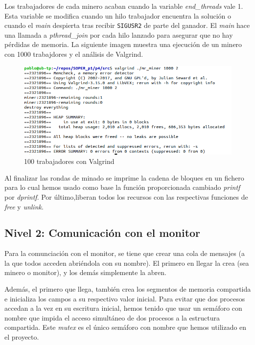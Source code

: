 \documentclass{article}
\begin{document}
    Los trabajadores de cada minero acaban cuando la variable \textit{end\_threads} vale 1. Esta variable se modifica cuando un hilo trabajador encuentra la solución o cuando el \textit{main} despierta tras recibir \texttt{SIGUSR2} de parte del ganador. El \textit{main} hace una llamada a \textit{pthread\_join} por cada hilo lanzado para asegurar que no hay pérdidas de memoria. La siguiente imagen muestra una ejecución de un minero con 1000 trabajdores y el análisis de Valgrind.

    \begin{figure}[h!]
        \centering
        \includegraphics[scale=.41]{./pruebas/valgrind_1000_trabajadores}
        \caption{100 trabajadores con Valgrind}
    \end{figure}


    
    Al finalizar las rondas de minado se imprime la cadena de bloques en un fichero para lo cual hemos usado como base la función proporcionada cambiado \textit{printf} por \textit{dprintf}. Por último,liberan todos los recursos con las respectivas funciones de \textit{free} y \textit{unlink}.

    

\subsection*{Nivel 2: Comunicación con el monitor}

    Para la comunciación con el monitor, se tiene que crear una cola de mensajes (a la que todos acceden abriéndola con su nombre). El primero en llegar la crea (sea minero o monitor), y los demás simplemente la abren.
    
    Además, el primero que llega, también crea los segmentos de memoria compartida e inicializa los campos a su respectivo valor inicial. Para evitar que dos procesos accedan a la vez en su escritura inicial, hemos tenido que usar un semáforo con nombre que impida el acceso simultáneo de dos procesos a la estructura compartida.
    Este \textit{mutex} es el único semáforo con nombre que hemos utilizado en el proyecto.
\end{document}
